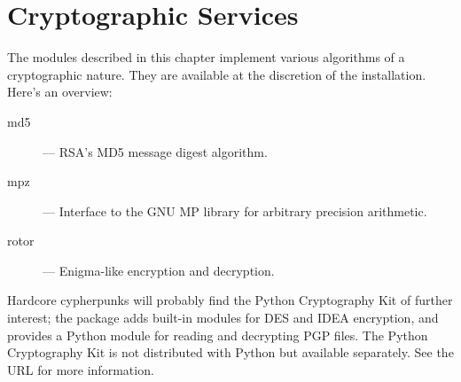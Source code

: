 \chapter{Cryptographic Services}

The modules described in this chapter implement various algorithms of
a cryptographic nature.  They are available at the discretion of the
installation.  Here's an overview:

\begin{description}

\item[md5]
--- RSA's MD5 message digest algorithm.

\item[mpz]
--- Interface to the GNU MP library for arbitrary precision arithmetic.

\item[rotor]
--- Enigma-like encryption and decryption.

\end{description}

Hardcore cypherpunks will probably find the Python Cryptography Kit of
further interest; the package adds built-in modules for DES and IDEA
encryption, and provides a Python module for reading and decrypting
PGP files.  The Python Cryptography Kit is not distributed with Python
but available separately.  See the URL
 for more information.
